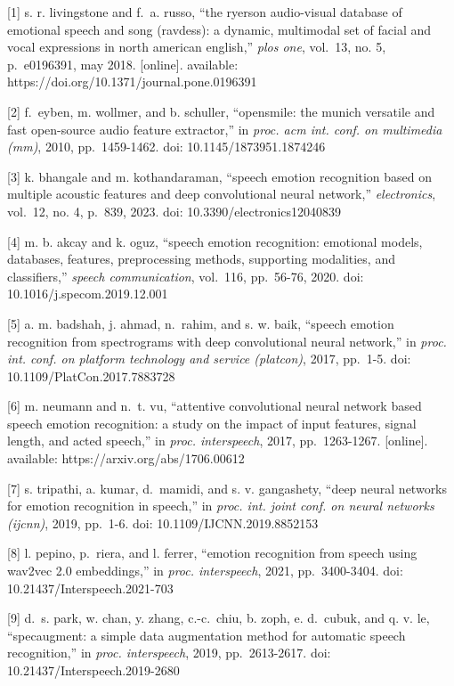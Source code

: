 \documentclass[conference]{IEEEtran}
\begin{document}
{{[}1{]} s. r. livingstone and f.~a. russo, ``the ryerson audio-visual
database of emotional speech and song (ravdess): a dynamic, multimodal
set of facial and vocal expressions in north american english,''
\emph{plos one}, vol.~13, no. 5, p.~e0196391, may 2018. {[}online{]}.
available: https://doi.org/10.1371/journal.pone.0196391

{[}2{]} f.~eyben, m. wollmer, and b. schuller, ``opensmile: the munich
versatile and fast open-source audio feature extractor,'' in \emph{proc.
acm int. conf. on multimedia (mm)}, 2010, pp.~1459-1462. doi:
10.1145/1873951.1874246

{[}3{]} k. bhangale and m. kothandaraman, ``speech emotion recognition
based on multiple acoustic features and deep convolutional neural
network,'' \emph{electronics}, vol.~12, no. 4, p.~839, 2023. doi:
10.3390/electronics12040839

{[}4{]} m. b. akcay and k. oguz, ``speech emotion recognition: emotional
models, databases, features, preprocessing methods, supporting
modalities, and classifiers,'' \emph{speech communication}, vol.~116,
pp.~56-76, 2020. doi: 10.1016/j.specom.2019.12.001

{[}5{]} a. m. badshah, j. ahmad, n.~rahim, and s. w. baik, ``speech
emotion recognition from spectrograms with deep convolutional neural
network,'' in \emph{proc. int. conf. on platform technology and service
(platcon)}, 2017, pp.~1-5. doi: 10.1109/PlatCon.2017.7883728

{[}6{]} m. neumann and n.~t. vu, ``attentive convolutional neural
network based speech emotion recognition: a study on the impact of input
features, signal length, and acted speech,'' in \emph{proc.
interspeech}, 2017, pp.~1263-1267. {[}online{]}. available:
https://arxiv.org/abs/1706.00612

{[}7{]} s. tripathi, a. kumar, d.~mamidi, and s. v. gangashety, ``deep
neural networks for emotion recognition in speech,'' in \emph{proc. int.
joint conf. on neural networks (ijcnn)}, 2019, pp.~1-6. doi:
10.1109/IJCNN.2019.8852153

{[}8{]} l. pepino, p.~riera, and l. ferrer, ``emotion recognition from
speech using wav2vec 2.0 embeddings,'' in \emph{proc. interspeech},
2021, pp.~3400-3404. doi: 10.21437/Interspeech.2021-703

{[}9{]} d.~s. park, w. chan, y. zhang, c.-c.~chiu, b. zoph, e. d.~cubuk,
and q. v. le, ``specaugment: a simple data augmentation method for
automatic speech recognition,'' in \emph{proc. interspeech}, 2019,
pp.~2613-2617. doi: 10.21437/Interspeech.2019-2680

}
\end{document}
